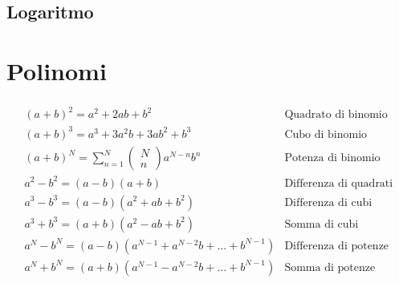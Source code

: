 \documentclass[letterpaper,10pt,italian]{jupyterBook}
\begin{document}
\subsection{Logaritmo}
\label{\detokenize{ch/algebra/real-algebra:logaritmo}}
\sphinxAtStartPar
{}

\sphinxAtStartPar
{}


\section{Polinomi}
\label{\detokenize{ch/algebra/real-algebra:polinomi}}
\sphinxAtStartPar
{}
\begin{equation*}
\begin{split}\begin{aligned}
 & (a+b)^2 = a^2 + 2ab + b^2                           & \text{Quadrato di binomio} \\
 & (a+b)^3 = a^3 + 3a^2 b + 3 a b^2 + b^3              & \text{Cubo di binomio} \\
 & (a+b)^N = \sum_{n=1}^{N} \left( \begin{matrix} N \\ n \end{matrix} \right) a^{N-n} b^n
 & \text{Potenza di binomio} \\
 & a^2 - b^2 = (a-b)(a+b)                              & \text{Differenza di quadrati} \\
 & a^3 - b^3 = (a-b)(a^2+ab+b^2)                       & \text{Differenza di cubi} \\
 & a^3 + b^3 = (a+b)(a^2-ab+b^2)                       & \text{Somma di cubi} \\
 & a^N - b^N = (a-b)(a^{N-1}+a^{N-2}b+\dots+b^{N-1})   & \text{Differenza di potenze} \\
 & a^N + b^N = (a+b)(a^{N-1}-a^{N-2}b+\dots+b^{N-1})   & \text{Somma di potenze dispari} \\
\end{aligned}\end{split}
\end{equation*}
\sphinxAtStartPar
{} 
\end{document}
